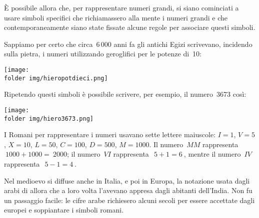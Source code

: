 \vspace{.25em}
È possibile allora che, per rappresentare numeri grandi, si siano 
cominciati a usare simboli specifici che richiamassero alla mente i 
numeri grandi e che contemporaneamente siano state fissate alcune 
regole per associare questi simboli.

Sappiamo per certo che circa~6\,000 anni fa gli antichi Egizi scrivevano, 
incidendo sulla pietra, i numeri utilizzando geroglifici per le potenze 
di~10:

\vspace{-2ex}
{\texttt{[image: \\folder img/hieropotdieci.png]}}

\vspace{-2ex}
Ripetendo questi simboli è possibile scrivere, per esempio, il numero~3673 
così:

\vspace{-2ex}
{\texttt{[image: \\folder img/hiero3673.png]}}
\vspace{-2ex}

I Romani per rappresentare i numeri usavano sette lettere maiuscole: 
\(I=1\), \(V=5\), \(X=10\), \(L=50\), \(C=100\), \(D=500\), 
\(M=1000\).
Il numero~\(MM\) rappresenta~\(~1000+1000 =~2000\); il numero~\( VI\) 
rappresenta~\(~5+1=6~\), mentre il numero~\( IV~\) rappresenta~\(~5-1=4~\).

Nel medioevo si diffuse anche in Italia, e poi in Europa, la notazione 
usata dagli arabi di allora che a loro volta l'avevano appresa dagli 
abitanti dell'India. 
Non fu un passaggio facile: le cifre arabe richiesero alcuni secoli per 
essere accettate dagli europei e soppiantare i simboli romani.


